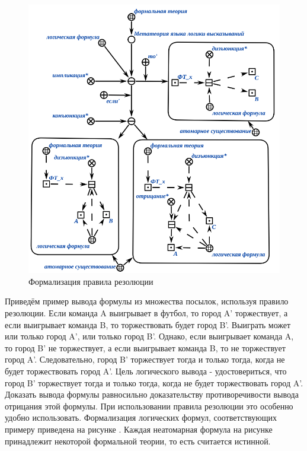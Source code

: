 \begin{figure}[H]
	\includegraphics[scale=0.6]{author/part3/figures/resolution.png}
	\caption{Формализация правила резолюции}
	\label{fig:resolution}
\end{figure}

Приведём пример вывода формулы из множества посылок, используя правило резолюции.
Если команда A выигрывает в футбол, то город A' торжествует, а если выигрывает команда B, то торжествовать будет город B'. Выиграть может или только город A', или только город B'. Однако, если выигрывает команда A, то город B' не торжествует, а если выигрывает команда B, то не торжествует город A'. Следовательно, город B' торжествует тогда и только тогда, когда не будет торжествовать город A'. Цель логического вывода - удостовериться, что город B' торжествует тогда и только тогда, когда не будет торжествовать город A'. Доказать вывода формулы равносильно доказательству противоречивости вывода отрицания этой формулы. При использовании правила резолюции это особенно удобно использовать.
Формализация логических формул, соответствующих примеру приведена на рисунке . Каждая неатомарная формула на рисунке принадлежит некоторой формальной теории, то есть считается истинной.

